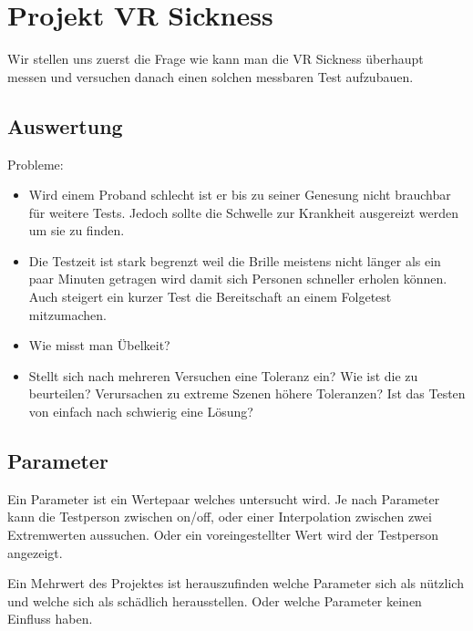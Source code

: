 \section{Projekt VR Sickness}
Wir stellen uns zuerst die Frage wie kann man die VR Sickness überhaupt messen und versuchen danach einen solchen messbaren Test aufzubauen.

\subsection{Auswertung}
Probleme:

\begin{itemize}
\item Wird einem Proband schlecht ist er bis zu seiner Genesung nicht brauchbar für weitere Tests. Jedoch sollte die Schwelle zur Krankheit ausgereizt werden um sie zu finden.

\item Die Testzeit ist stark begrenzt weil die Brille meistens nicht länger als ein paar Minuten getragen wird damit sich Personen schneller erholen können. Auch steigert ein kurzer Test die Bereitschaft an einem Folgetest mitzumachen.

\item Wie misst man Übelkeit?

\item Stellt sich nach mehreren Versuchen eine Toleranz ein? Wie ist die zu beurteilen? Verursachen zu extreme Szenen höhere Toleranzen? Ist das Testen von einfach nach schwierig eine Lösung?

\end{itemize}

\subsection{Parameter}
Ein Parameter ist ein Wertepaar welches untersucht wird.
Je nach Parameter kann die Testperson zwischen on/off, oder einer Interpolation zwischen zwei Extremwerten aussuchen. Oder ein voreingestellter Wert wird der Testperson angezeigt.

Ein Mehrwert des Projektes ist herauszufinden welche Parameter sich als nützlich und welche sich als schädlich herausstellen. Oder welche Parameter keinen Einfluss haben.


